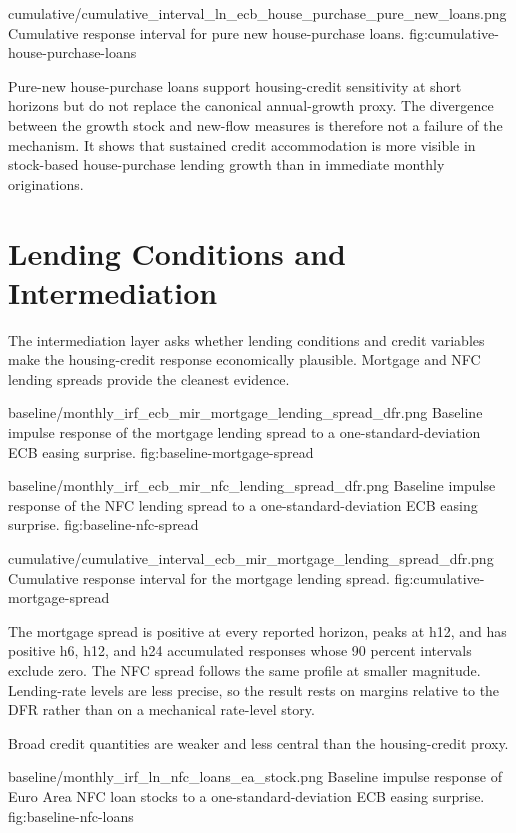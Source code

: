 \thesisfigure
  {cumulative/cumulative_interval_ln_ecb_house_purchase_pure_new_loans.png}
  {Cumulative response interval for pure new house-purchase loans.}
  {fig:cumulative-house-purchase-loans}

Pure-new house-purchase loans support housing-credit sensitivity at short horizons but do not replace the canonical annual-growth proxy. The divergence between the growth stock and new-flow measures is therefore not a failure of the mechanism. It shows that sustained credit accommodation is more visible in stock-based house-purchase lending growth than in immediate monthly originations.

\section{Lending Conditions and Intermediation}

The intermediation layer asks whether lending conditions and credit variables make the housing-credit response economically plausible. Mortgage and NFC lending spreads provide the cleanest evidence.

\thesisfigure
  {baseline/monthly_irf_ecb_mir_mortgage_lending_spread_dfr.png}
  {Baseline impulse response of the mortgage lending spread to a one-standard-deviation ECB easing surprise.}
  {fig:baseline-mortgage-spread}

\thesisfigure
  {baseline/monthly_irf_ecb_mir_nfc_lending_spread_dfr.png}
  {Baseline impulse response of the NFC lending spread to a one-standard-deviation ECB easing surprise.}
  {fig:baseline-nfc-spread}

\thesisfigure
  {cumulative/cumulative_interval_ecb_mir_mortgage_lending_spread_dfr.png}
  {Cumulative response interval for the mortgage lending spread.}
  {fig:cumulative-mortgage-spread}

The mortgage spread is positive at every reported horizon, peaks at h12, and has positive h6, h12, and h24 accumulated responses whose 90 percent intervals exclude zero. The NFC spread follows the same profile at smaller magnitude. Lending-rate levels are less precise, so the result rests on margins relative to the DFR rather than on a mechanical rate-level story.

Broad credit quantities are weaker and less central than the housing-credit proxy.

\thesisfigure
  {baseline/monthly_irf_ln_nfc_loans_ea_stock.png}
  {Baseline impulse response of Euro Area NFC loan stocks to a one-standard-deviation ECB easing surprise.}
  {fig:baseline-nfc-loans}

